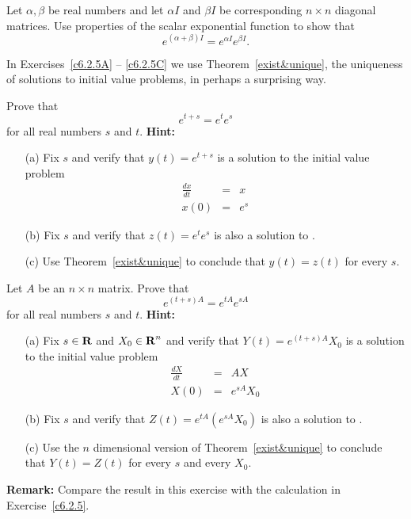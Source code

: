 \documentclass{ximera}
\begin{document}
\begin{exercise} \label{c6.2.5}
Let $\alpha,\beta$ be real numbers and let $\alpha I$ and $\beta
I$ be corresponding $n\times n$ diagonal matrices.  Use
properties of the scalar exponential function to show that
\[
     e^{(\alpha + \beta)I} = e^{\alpha I}e^{\beta I}.
\]
\end{exercise}

\noindent In Exercises~\ref{c6.2.5A} -- \ref{c6.2.5C} we use
Theorem~\ref{exist&unique}, the uniqueness of solutions to initial value
problems, in perhaps a surprising way.
\begin{exercise}  \label{c6.2.5A}
Prove that
\[
e^{t+s} = e^te^s
\]
for all real numbers $s$ and $t$.  {\bf Hint:}
\begin{itemize}
\item[(a)]  Fix $s$ and verify that $y(t) = e^{t+s}$ is a solution to the
initial value problem
\begin{equation}  \label{E:init1}
\begin{array}{rcl}
\frac{dx}{dt} & = & x \\
x(0) & = & e^s
\end{array}
\end{equation}
\item[(b)] Fix $s$ and verify that $z(t) = e^te^s$ is also a solution to
.
\item[(c)]  Use Theorem~\ref{exist&unique} to conclude that $y(t)=z(t)$ for
every $s$.
\end{itemize}
\end{exercise}
\begin{exercise}  \label{c6.2.5B}
Let $A$ be an $n\times n$ matrix.  Prove that
\[
e^{(t+s)A} = e^{tA}e^{sA}
\]
for all real numbers $s$ and $t$.  {\bf Hint:}
\begin{itemize}
\item[(a)]  Fix $s\in\mbox{$\bf{R}$}$ and $X_0\in\mbox{$\bf{R}$}^n$ and verify that
$Y(t) = e^{(t+s)A}X_0$ is a solution to the initial value problem
\begin{equation}  \label{E:init2}
\begin{array}{rcl}
\frac{dX}{dt} & = & AX \\
X(0) & = & e^{sA}X_0
\end{array}
\end{equation}
\item[(b)] Fix $s$ and verify that $Z(t) = e^{tA}\left(e^{sA}X_0\right)$ is
also a solution to .
\item[(c)]  Use the $n$ dimensional version of Theorem~\ref{exist&unique} to
conclude that $Y(t)=Z(t)$ for every $s$ and every $X_0$.
\end{itemize}
{\bf Remark:}  Compare the result in this exercise with the calculation in
Exercise~\ref{c6.2.5}.
\end{exercise}
\end{document}
